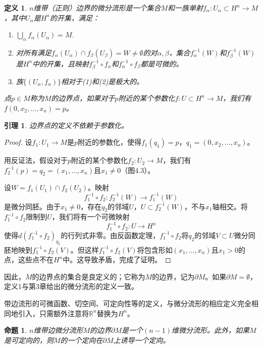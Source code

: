 \documentclass[12pt,a4paper]{ctexbook}
\newtheorem{proposition}[theorem]{命题}
\newtheorem{lemma}[theorem]{引理}
\newtheorem{definition}[theorem]{定义}
\begin{document}
\begin{definition}
$n$维带（正则）边界的微分流形是一个集合$M$和一族单射$f_\alpha:U_\alpha\subset H^n\to M$，其中$U_\alpha$是$H^n$的开集，满足：
\begin{enumerate}
    \item $\bigcup_\alpha f_\alpha(U_\alpha) = M$.
    \item 对所有满足$f_\alpha(U_\alpha)\cap f_\beta(U_\beta)=W\neq\emptyset$的对$\alpha,\beta$，集合$f_\alpha^{-1}(W)$和$f_\beta^{-1}(W)$是$H^n$中的开集，且映射$f_\beta^{-1}\circ f_\alpha$和$f_\alpha^{-1}\circ f_\beta$都是可微的。
    \item 族$\{(U_\alpha,f_\alpha)\}$相对于(1)和(2)是极大的。
\end{enumerate}

点$p\in M$称为$M$的边界点，如果对于$p$附近的某个参数化$f:U\subset H^n\to M$，我们有$f(0,x_2,\ldots,x_n)=p$。
\end{definition}

\begin{lemma}
边界点的定义不依赖于参数化。
\end{lemma}

\begin{proof}
设$f_1:U_1\to M$是$p$附近的参数化，使得$f_1(q_1)=p$，$q_1=(0,x_2,\ldots,x_n)$。

用反证法，假设对于$p$附近的某个参数化$f_2:U_2\to M$，我们有$f_2^{-1}(p)=q_2=(x_1,\ldots,x_n)$且$x_1\neq 0$（图4.3）。

设$W = f_1(U_1)\cap f_2(U_2)$。映射
$$f_1^{-1}\circ f_2: f_2^{-1}(W)\to f_1^{-1}(W)$$
是微分同胚。由于$x_1\neq 0$，存在$q_2$的邻域$U$，$U\subset f_2^{-1}(W)$，不与$x_1$轴相交。将$f_1^{-1}\circ f_2$限制到$U$，我们将有一个可微映射
$$f_1^{-1}\circ f_2: U\to H^n$$
使得$d(f_1^{-1}\circ f_2)_{q_2}$的行列式非零。由反函数定理，$f_1^{-1}\circ f_2$将$q_2$的邻域$V\subset U$微分同胚地映到$f_1^{-1}\circ f_2(V)$。但这样$f_1^{-1}\circ f_2(V)$将包含形如$(x_1,\ldots,x_n)$且$x_1>0$的点，这些点不在$H^n$中。这导致矛盾，完成了证明。
\end{proof}

因此，$M$的边界点的集合是良定义的；它称为$M$的边界，记为$\partial M$。如果$\partial M=\emptyset$，定义1与第3章给出的微分流形的定义一致。

带边流形的可微函数、切空间、可定向性等的定义，与微分流形的相应定义完全相同地引入，只需额外注意将$\mathbb{R}^n$替换为$H^n$。

\begin{proposition}
$n$维带边微分流形$M$的边界$\partial M$是一个$(n-1)$维微分流形。此外，如果$M$是可定向的，则$M$的一个定向在$\partial M$上诱导一个定向。
\end{proposition}
\end{document}
